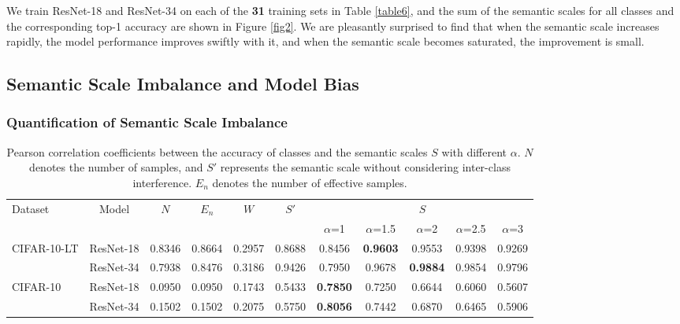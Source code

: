 \documentclass[10pt]{article} %
\begin{document}
We train ResNet-18 and ResNet-34 \cite {paper32} on each of the \textbf{31} training sets in Table \ref{table6}, and the sum of the semantic scales for all classes and the corresponding top-1 accuracy are shown in Figure \ref{fig2}. We are pleasantly surprised to find that when the semantic scale increases rapidly, the model performance improves swiftly with it, and when the semantic scale becomes saturated, the improvement is small.


\subsection{Semantic Scale Imbalance and Model Bias \label{3.4}}
\subsubsection{Quantification of Semantic Scale Imbalance}

\begin{table}[h]
\renewcommand\arraystretch{1.3}
\vskip -0.15in
\setlength{\tabcolsep}{6pt} %
\caption{Pearson correlation coefficients between the accuracy of classes and the semantic scales $S$ with different $\alpha$. $N$ denotes the number of samples, and $S'$ represents the semantic scale without considering inter-class interference. $E_n$ denotes the number of effective samples.}
\label{table1}
\vskip 0.03in
\centering  
\begin{small}
\begin{tabular}{l|c|c|c|c|c|ccccc }
\hline \toprule
\multirow{2}{*}{Dataset}    & \multirow{2}{*}{Model}   & \multirow{2}{*}{$N$} & \multirow{2}{*}{$E_n$} & \multirow{2}{*}{$W$}  &  \multirow{2}{*}{$S'$}  &\multicolumn{5}{c}{$S$}   \\ \cline{7-11}
       & & & & & &$\alpha$=1  &$\alpha$=1.5  &$\alpha$=2   &$\alpha$=2.5   &$\alpha$=3 \\  \hline
\multirow{2}{*}{CIFAR-10-LT}  & ResNet-18 & 0.8346 &0.8664 &0.2957 & 0.8688 & 0.8456 & \textbf{0.9603} & 0.9553  & 0.9398 & 0.9269 \\
  & ResNet-34 & 0.7938 &0.8476 &0.3186 & 0.9426 & 0.7950 & 0.9678  & \textbf{0.9884} & 0.9854 & 0.9796 \\  \hline
\multirow{2}{*}{CIFAR-10} & ResNet-18 & 0.0950 &0.0950 & 0.1743 & 0.5433 &\textbf{0.7850} & 0.7250  & 0.6644 & 0.6060 & 0.5607 \\
  & ResNet-34 & 0.1502 &0.1502 & 0.2075 & 0.5750 & \textbf{0.8056} & 0.7442 & 0.6870  & 0.6465 & 0.5906 \\
\bottomrule \hline
 \end{tabular}
 \end{small}
\vskip -0.05in
\end{table}
\end{document}
